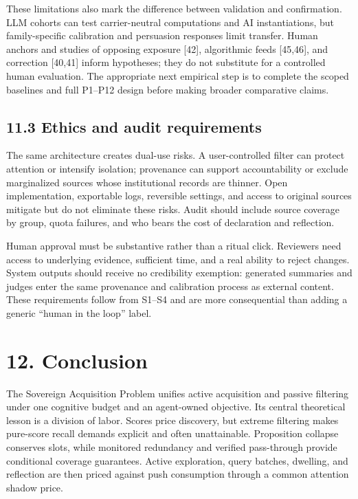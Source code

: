 \documentclass[
  11pt]{article}
\begin{document}
These limitations also mark the difference between validation and confirmation. LLM cohorts can test carrier-neutral computations and AI instantiations, but family-specific calibration and persuasion responses limit transfer. Human anchors and studies of opposing exposure {[}42{]}, algorithmic feeds {[}45,46{]}, and correction {[}40,41{]} inform hypotheses; they do not substitute for a controlled human evaluation. The appropriate next empirical step is to complete the scoped baselines and full P1--P12 design before making broader comparative claims.

\subsection{11.3 Ethics and audit requirements}\label{ethics-and-audit-requirements}

The same architecture creates dual-use risks. A user-controlled filter can protect attention or intensify isolation; provenance can support accountability or exclude marginalized sources whose institutional records are thinner. Open implementation, exportable logs, reversible settings, and access to original sources mitigate but do not eliminate these risks. Audit should include source coverage by group, quota failures, and who bears the cost of declaration and reflection.

Human approval must be substantive rather than a ritual click. Reviewers need access to underlying evidence, sufficient time, and a real ability to reject changes. System outputs should receive no credibility exemption: generated summaries and judges enter the same provenance and calibration process as external content. These requirements follow from S1--S4 and are more consequential than adding a generic ``human in the loop'' label.

\section{12. Conclusion}\label{conclusion}

The Sovereign Acquisition Problem unifies active acquisition and passive filtering under one cognitive budget and an agent-owned objective. Its central theoretical lesson is a division of labor. Scores price discovery, but extreme filtering makes pure-score recall demands explicit and often unattainable. Proposition collapse conserves slots, while monitored redundancy and verified pass-through provide conditional coverage guarantees. Active exploration, query batches, dwelling, and reflection are then priced against push consumption through a common attention shadow price.
\end{document}
